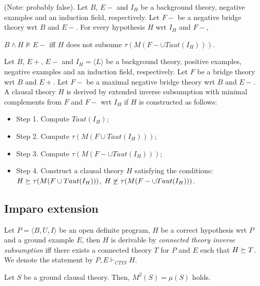 \begin{conjecture}\label{subsumptionConjectureNegativeExamples}
(Note: probably false).
Let $B$, $E-$ and $I_H$ be a background theory, negative examples and an induction field, respectively. Let $F-$ be a negative bridge theory wrt $B$ and $E-$. For every hypothesis $H$ wrt $I_H$ and $F-$,

$B \wedge H \not\models E-$ iff $H$ does not subsume
$\tau(M(F- \cup Taut(I_H)))$.
\end{conjecture}

\begin{defn}
Let $B$, $E+$, $E-$ and $I_H = \langle L \rangle$ be a background theory, positive examples, negative examples and an induction field, respectively.
Let $F$ be a bridge theory wrt $B$ and $E+$. Let $F-$ be a maximal negative bridge theory wrt $B$ and $E-$. A clausal theory $H$ is derived
by extended inverse subsumption with minimal complements from $F$ and $F-$ wrt $I_H$ if $H$ is constructed as
follows:
\begin{itemize}
\item Step 1. Compute $Taut(I_H)$;
\item Step 2. Compute $\tau(M(F \cup Taut(I_H)))$;
\item Step 3. Compute $\tau(M(F- \cup Taut(I_H)))$;
\item Step 4. Construct a clausal theory $H$ satisfying the conditions:
$H \succeq \tau(M(F \cup Taut(I_H)))$,
$H \not\succeq \tau(M(F- \cup Taut(I_H)))$.
\end{itemize}
\end{defn}

\subsection{Imparo extension}
\begin{defn}
Let $P=\langle B, U, I \rangle$ be an open definite program, $H$ be a correct hypothesis wrt $P$ and a ground example $E$, then $H$ is derivable by
\emph{connected theory inverse subsumption}
iff there exists a connected theory $T$ for $P$ and $E$ such that $H \succeq T$.
We denote the statement by $P, E \vdash_{CTIS} H$.
\end{defn}

\begin{thm}\label{yamamoto2012inverseTheorem4}\cite{yamamoto2012inverse}
Let $S$ be a ground clausal theory. Then, $M^2(S) = \mu(S)$ holds.
\end{thm}


